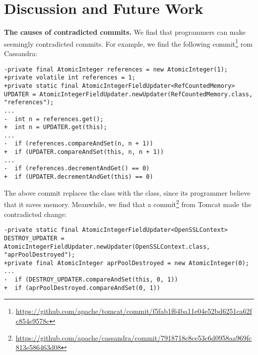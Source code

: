 \section{Discussion and Future Work}
\label{sec:discuss}
%
%
%
%
%
%
%
%

\noindent
\textbf{The causes of contradicted commits.} We find that programmers can make seemingly contradicted commits. For example, we find the following commit\footnote{\url{https://github.com/apache/tomcat/commit/f5fab1f64ba11e04e52bd6251ca62fc854e9578c}} rom Cassandra:

\begin{lstlisting}
-private final AtomicInteger references = new AtomicInteger(1);
+private volatile int references = 1;
+private static final AtomicIntegerFieldUpdater<RefCountedMemory> UPDATER = AtomicIntegerFieldUpdater.newUpdater(RefCountedMemory.class, "references");
...
-  int n = references.get();
+  int n = UPDATER.get(this);
...
-  if (references.compareAndSet(n, n + 1))
+  if (UPDATER.compareAndSet(this, n, n + 1))
...
-  if (references.decrementAndGet() == 0)
+  if (UPDATER.decrementAndGet(this) == 0)
\end{lstlisting}

The above commit replaces the  class with the  class, since its programmer believe that it saves memory. Meanwhile, we find that a commit\footnote{\url{https://github.com/apache/cassandra/commit/7918718c8ce53c6d0958aa969fc813e586463d08}} from Tomcat made the contradicted change:

\begin{lstlisting}
-private static final AtomicIntegerFieldUpdater<OpenSSLContext> DESTROY_UPDATER = AtomicIntegerFieldUpdater.newUpdater(OpenSSLContext.class, "aprPoolDestroyed");
+private final AtomicInteger aprPoolDestroyed = new AtomicInteger(0);
...
-  if (DESTROY_UPDATER.compareAndSet(this, 0, 1))
+  if (aprPoolDestroyed.compareAndSet(0, 1))
\end{lstlisting}

